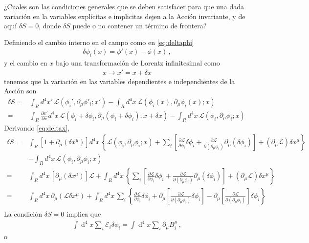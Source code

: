 ¿Cuales son las condiciones generales que se deben satisfacer para que una dada variación en la variables explícitas e implicitas dejen a la Acción invariante, y de aquí $\delta S=0$, donde $\delta S$ puede o no contener un término de frontera?

Definiendo el cambio interno en el campo como en \eqref{eq:deltaphi}
\begin{align}
  \delta\phi_i(x)=\phi'(x)-\phi(x)\,,
\end{align}
y el cambio en $x$ bajo una transformación de Lorentz infinitesimal como
\begin{align}
\label{eq:deltax}
  x\to x'=x+\delta x
\end{align}
tenemos que la variación en las variables dependientes e independientes de la Acción son
\begin{align}
   \delta S=&\int_{R}d^4x'\,\mathcal{L} \left( \phi_{i}',\partial_{\mu}\phi'_i;x' \right)- \int_{R}d^4x\,\mathcal{L} \left( \phi_{i}(x),\partial_{\mu}\phi_i(x);x \right) \nonumber\\
     =&\int_{R}\frac{\partial x'}{\partial x}d^4x\,\mathcal{L} \left( \phi_{i}+\delta\phi_i,\partial_{\mu}(\phi_i+\delta\phi_i);x+\delta x \right)- \int_{R}d^4x\,\mathcal{L} \left( \phi_{i},\partial_{\mu}\phi_i;x \right)\,
\end{align}
Derivando \eqref{eq:deltax},
\begin{align}
     \delta S =&\int_{R} \left[ 1+\partial_{\mu} \left( \delta x^{\mu}  \right)\right]  d^4x\,\left\{ \mathcal{L}(\phi_i,\partial_{\mu}\phi_i;x)+\sum_i \left[ \frac{\partial\mathcal{L}}{\partial\phi_i}\delta\phi_{i} +\frac{\partial\mathcal{L}}{\partial(\partial_{\mu}\phi_i)}\partial_{\mu}(\delta\phi_{i}) \right]+\left( \partial_{\mu}\mathcal{L} \right)\delta x^{\mu} \right\}\nonumber\\
      &- \int_{R}d^4x\,\mathcal{L} \left( \phi_{i},\partial_{\mu}\phi_i;x \right) \nonumber\\
     =&\int_{R} d^4x\,\left[ \partial_{\mu} \left( \delta x^{\mu}  \right)\right] \mathcal{L} + \int_{R}d^4x\,\left\{\sum_i \left[ \frac{\partial\mathcal{L}}{\partial\phi_i}\delta\phi_{i} +\frac{\partial\mathcal{L}}{\partial(\partial_{\mu}\phi_i)}\partial_{\mu}(\delta\phi_{i}) \right]+\left( \partial_{\mu}\mathcal{L} \right)\delta x^{\mu} \right\}\nonumber\\
     =&\int_{R} d^4x\,\partial_{\mu} \left(\mathcal{L} \delta x^{\mu}  \right)  + \int_{R}d^4x\,\sum_i \left\{ \frac{\partial\mathcal{L}}{\partial\phi_i}\delta\phi_{i} +\partial_{\mu} \left[ \frac{\partial\mathcal{L}}{\partial(\partial_{\mu}\phi_i)}\delta\phi_{i} \right]-\partial_{\mu} \left[ \frac{\partial\mathcal{L}}{\partial(\partial_{\mu}\phi_i)}\right]\delta\phi_{i}  \right\}\nonumber\\
\end{align}
La condición $\delta S=0$ implica que
\begin{align}
\label{eq:masterint}
\int \operatorname{d}^4x  \sum_i \mathcal{E}_i \delta\phi_i =\int \operatorname{d}^4x \sum_i \partial_{\mu} B^{\mu}_{i}\,,
\end{align}
o


